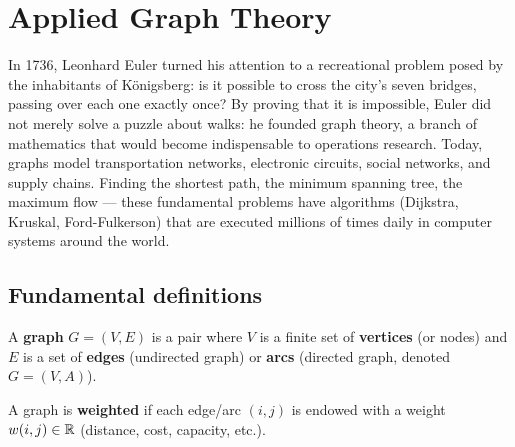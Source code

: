 \chapter{Applied Graph Theory}
\label{ch:graphs}

In 1736, Leonhard Euler turned his attention to a recreational problem posed by the inhabitants of K\"onigsberg: is it possible to cross the city's seven bridges, passing over each one exactly once? By proving that it is impossible, Euler did not merely solve a puzzle about walks: he founded graph theory, a branch of mathematics that would become indispensable to operations research. Today, graphs model transportation networks, electronic circuits, social networks, and supply chains. Finding the shortest path, the minimum spanning tree, the maximum flow --- these fundamental problems have algorithms (Dijkstra, Kruskal, Ford-Fulkerson) that are executed millions of times daily in computer systems around the world.

\section{Fundamental definitions}

\begin{definition}[Graph]
A \textbf{graph} $G = (V, E)$ is a pair where $V$ is a finite set of
\textbf{vertices} (or nodes) and $E$ is a set of \textbf{edges} (undirected
graph) or \textbf{arcs} (directed graph, denoted $G = (V, A)$).
\end{definition}

\begin{definition}
A graph is \textbf{weighted} if each edge/arc $(i,j)$ is endowed with a weight
$w(i,j) \in \mathbb{R}$ (distance, cost, capacity, etc.).
\end{definition}

\begin{center}
\end{center}

